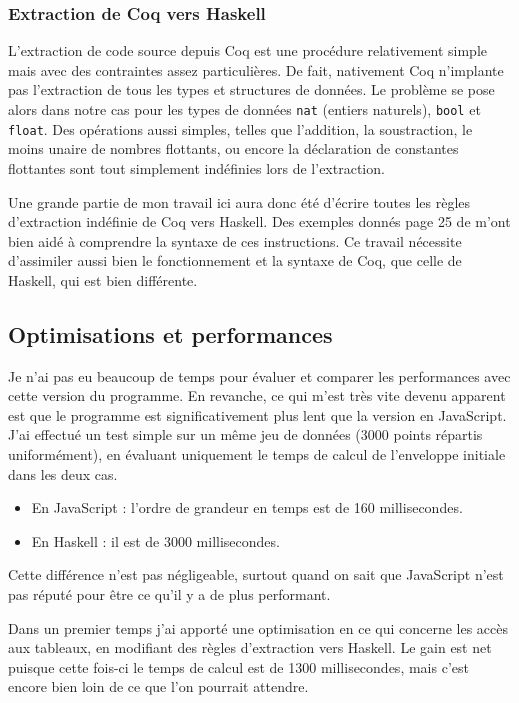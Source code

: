 \documentclass[]{article}
\begin{document}
\subsubsection{Extraction de Coq vers Haskell}
L'extraction de code source depuis Coq est une procédure relativement simple mais avec des contraintes assez particulières. De fait, nativement Coq n'implante pas l'extraction de tous les types et structures de données. Le problème se pose alors dans notre cas pour les types de données \texttt{nat} (entiers naturels), \texttt{bool} et \texttt{float}. Des opérations aussi simples, telles que l'addition, la soustraction, le moins unaire de nombres flottants, ou encore la déclaration de constantes flottantes sont tout simplement indéfinies lors de l'extraction.

Une grande partie de mon travail ici aura donc été d'écrire toutes les règles d'extraction indéfinie de Coq vers Haskell. Des exemples donnés page 25 de \cite{magaud:hal-01066671} m'ont bien aidé à comprendre la syntaxe de ces instructions. Ce travail nécessite d'assimiler aussi bien le fonctionnement et la syntaxe de Coq, que celle de Haskell, qui est bien différente.

\subsection{Optimisations et performances}\label{sec:optimisations}
Je n'ai pas eu beaucoup de temps pour évaluer et comparer les performances avec cette version du programme. En revanche, ce qui m'est très vite devenu apparent est que le programme est significativement plus lent que la version en JavaScript. J'ai effectué un test simple sur un même jeu de données (3000 points répartis uniformément), en évaluant uniquement le temps de calcul de l'enveloppe initiale dans les deux cas.
\begin{itemize}
	\item En JavaScript : l'ordre de grandeur en temps est de 160 millisecondes.
	\item En Haskell : il est de 3000 millisecondes.
\end{itemize}
Cette différence n'est pas négligeable, surtout quand on sait que JavaScript n'est pas réputé pour être ce qu'il y a de plus performant.

Dans un premier temps j'ai apporté une optimisation en ce qui concerne les accès aux tableaux, en modifiant des règles d'extraction vers Haskell. Le gain est net puisque cette fois-ci le temps de calcul est de 1300 millisecondes, mais c'est encore bien loin de ce que l'on pourrait attendre.
\end{document}
